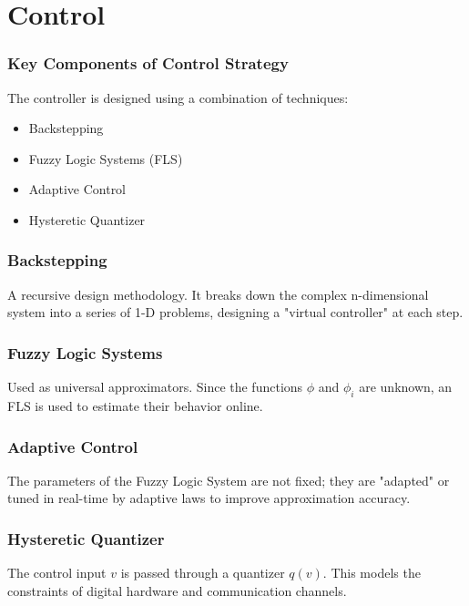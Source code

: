 \documentclass[18p]{beamer}
\begin{document}
\section{Control}
\begin{frame}
	\frametitle{Key Components of Control Strategy}
	The controller is designed using a combination of techniques:
	\begin{itemize}
		\item Backstepping
		\item Fuzzy Logic Systems (FLS)
		\item Adaptive Control
		\item Hysteretic Quantizer
	\end{itemize}
\end{frame}
\begin{frame}
	\frametitle{Backstepping}
 A recursive design methodology. It breaks down the complex n-dimensional system into a series of 1-D problems, designing a "virtual controller" at each step.
\end{frame}
\begin{frame}
	\frametitle{Fuzzy Logic Systems}
Used as universal approximators. Since the functions $\phi$ and $\phi_i$ are unknown, an FLS is used to estimate their behavior online.
\end{frame}
\begin{frame}
	\frametitle{Adaptive Control}
The parameters of the Fuzzy Logic System are not fixed; they are "adapted" or tuned in real-time by adaptive laws to improve approximation accuracy.
\end{frame}
\begin{frame}
	\frametitle{Hysteretic Quantizer}
The control input $v$ is passed through a quantizer $q(v)$. This models the constraints of digital hardware and communication channels.
\end{frame}

\end{document}
